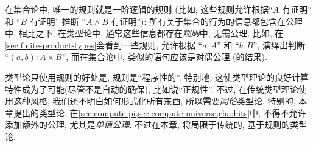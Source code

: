在集合论中, 唯一的规则就是一阶逻辑的规则 (比如, 这些规则允许根据``$A$ 有证明'' 和 ``$B$ 有证明'' 推断 ``$A\wedge B$ 有证明''): 所有关于集合的行为的信息都包含在公理中.
相比之下, 在类型论中, 通常这些信息都存在\emph{规则}中, 无需公理.
比如, 在\cref{sec:finite-product-types}会看到一些规则, 允许根据 ``$a:A$'' 和 ``$b:B$'', 演绎出判断 ``$(a,b):A\times B$'', 而在集合论中, 类似的语句应该是对偶公理 (的结果).

类型论只使用规则的好处是, 规则是``程序性的''.
特别地, 这使类型理论的良好计算特性成为了可能(尽管不是自动的确保), 比如说``正规性''.
%
不过, 在传统类型理论使用这种风格, 我们还不明白如何形式化所有东西, 所以需要\emph{同伦}类型论.
特别的, 本章提出的类型论, 在\cref{sec:compute-pi,sec:compute-universe,cha:hits}中, 不得不允许添加额外的公理, 尤其是\emph{单值公理}.
不过在本章, 将局限于传统的, 基于规则的类型论.